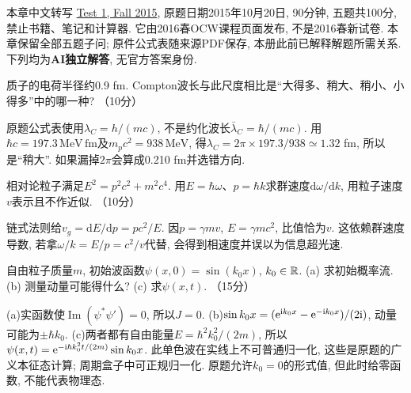 本章中文转写 \href{https://ocw.mit.edu/courses/8-04-quantum-physics-i-spring-2016/resources/mit8_04s16_test1_fall2015/}{Test 1, Fall 2015}, 原题日期2015年10月20日, 90分钟, 五题共100分, 禁止书籍、笔记和计算器. 它由2016春OCW课程页面发布, 不是2016春新试卷. 本章保留全部五题子问; 原件公式表随来源PDF保存, 本册此前已解释解题所需关系. 下列均为\textbf{AI独立解答}, 无官方答案身份.

\begin{exercise}
质子的电荷半径约0.9 fm. Compton波长与此尺度相比是“大得多、稍大、稍小、小得多”中的哪一种? （10分）
\end{exercise}
\begin{solution}
原题公式表使用$\lambda_C=h/(mc)$, 不是约化波长$\bar\lambda_C=\hbar/(mc)$. 用$\hbar c=197.3\,\mathrm{MeV\,fm}$及$m_pc^2=938\,\mathrm{MeV}$, 得$\lambda_C=2\pi\times197.3/938\simeq1.32$ fm, 所以是“稍大”. 如果漏掉$2\pi$会算成0.210 fm并选错方向.
\end{solution}

\begin{exercise}
相对论粒子满足$E^2=p^2c^2+m^2c^4$. 用$E=\hbar\omega$、$p=\hbar k$求群速度$\mathrm d\omega/\mathrm dk$, 用粒子速度$v$表示且不作近似. （10分）
\end{exercise}
\begin{solution}
链式法则给$v_g=\mathrm dE/\mathrm dp=pc^2/E$. 因$p=\gamma mv$, $E=\gamma mc^2$, 比值恰为$v$. 这依赖群速度导数, 若拿$\omega/k=E/p=c^2/v$代替, 会得到相速度并误以为信息超光速.
\end{solution}

\begin{exercise}
自由粒子质量$m$, 初始波函数$\psi(x,0)=\sin(k_0x)$, $k_0\in\mathbb R$.
(a) 求初始概率流.
(b) 测量动量可能得什么?
(c) 求$\psi(x,t)$. （15分）
\end{exercise}
\begin{solution}
(a)实函数使$\operatorname{Im}(\psi^*\psi')=0$, 所以$J=0$. (b)$\sin k_0x=(\mathrm e^{\mathrm i k_0x}-\mathrm e^{-\mathrm i k_0x})/(2\mathrm i)$, 动量可能为$\pm\hbar k_0$. (c)两者都有自由能量$E=\hbar^2k_0^2/(2m)$, 所以$\psi(x,t)=\mathrm e^{-\mathrm i\hbar k_0^2t/(2m)}\sin k_0x$. 此单色波在实线上不可普通归一化, 这些是原题的广义本征态计算; 周期盒子中可正规归一化. 原题允许$k_0=0$的形式值, 但此时给零函数, 不能代表物理态.
\end{solution}

